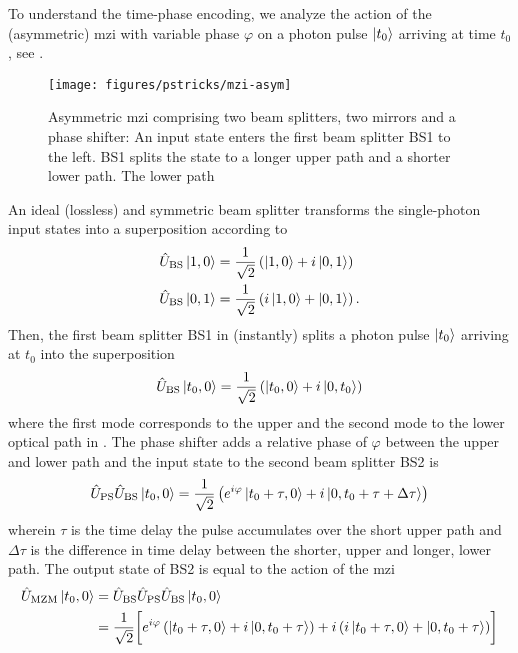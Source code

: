 To understand the time-phase encoding, we analyze the action of the (asymmetric) \gls{mzi} with variable phase $\varphi$ on a photon pulse $\ket{t_0}$ arriving at time $t_0$, see .
\begin{figure}[htb]
    \centering
    \texttt{[image: figures/pstricks/mzi-asym]}
     \caption{Asymmetric \gls{mzi} comprising two beam splitters, two mirrors and a phase shifter: An input state enters the first beam splitter BS1 to the left. BS1 splits the state to a longer upper path and a shorter lower path. The lower path}\label{fig:mzi_asym}
\end{figure}
An ideal (lossless) and symmetric beam splitter transforms the single-photon input states into a superposition according to~\cite[p.~134]{Haroche2006}
\begin{align}
	\hat{U}_\text{BS}
	\ket{1,0}
	&=
	\frac{1}{\sqrt{2}}
	\left(\ket{1,0}+i\ket{0,1}\right)
	\\
	\hat{U}_\text{BS}
	\ket{0,1}
	&=
	\frac{1}{\sqrt{2}}
	\left(i\ket{1,0}+\ket{0,1}\right)
	.
\end{align}
Then, the first beam splitter BS1 in  (instantly) splits a photon pulse $\ket{t_0}$ arriving at $t_0$ into the superposition
\begin{equation}
	\hat{U}_\text{BS}
	\ket{t_0,0}
	=
	\frac{1}{\sqrt{2}}
	\left(\ket{t_0,0}+i\ket{0,t_0}\right)
\end{equation}
where the first mode corresponds to the upper and the second mode to the lower optical path in .
The phase shifter adds a relative phase of $\varphi$ between the upper and lower path and the input state to the second beam splitter BS2 is
\begin{equation}
	\hat{U}_\text{PS}
	\hat{U}_\text{BS}
	\ket{t_0,0}
	=
	\frac{1}{\sqrt{2}}
	\left(
		e^{i\varphi}
		\ket{t_0+\tau,0}
		+
		i
		\ket{0,t_0+\tau+\Delta\tau}
	\right)
\end{equation}
wherein $\tau$ is the time delay the pulse accumulates over the short upper path and $\Delta\tau$ is the difference in time delay between the shorter, upper and longer, lower path.
The output state of BS2 is equal to the action of the \gls{mzi}
\begin{equation}
	\begin{split}
		\hat{U}_\text{MZM}
		\ket{t_0,0}
		&=
		\hat{U}_\text{BS}
		\hat{U}_\text{PS}
		\hat{U}_\text{BS}
		\ket{t_0,0}
		\\
		&=
		\frac{1}{\sqrt{2}}
		\biggl[
			e^{i\varphi}
			\left(
				\ket{t_0+\tau,0}
				+
				i\ket{0,t_0+\tau}
			\right)
			+
			i
			\left(
				i\ket{t_0+\tau,0}
				+
				\ket{0,t_0+\tau}
			\right)
		\biggr]
	\end{split}
\end{equation}

